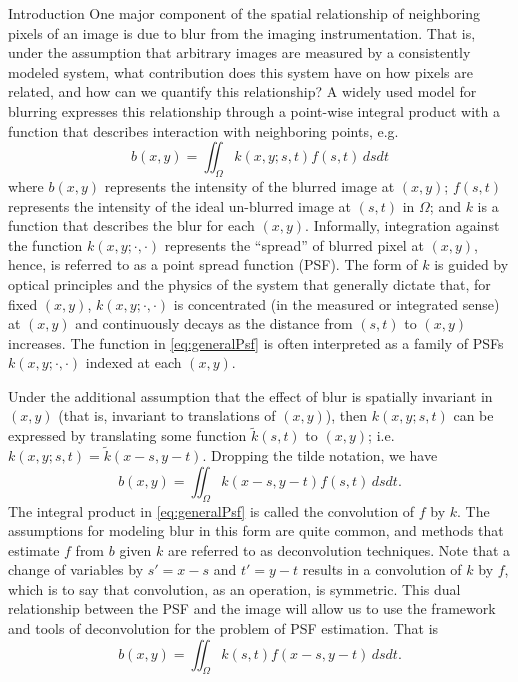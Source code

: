 \begin{chapter}{Introduction}
  One major component of the spatial relationship of neighboring pixels of an image is due to blur from the imaging instrumentation.
  That is, under the assumption that arbitrary images are measured by a consistently modeled system, what contribution does this system have on how pixels are related, and how can we quantify this relationship?
  A widely used model for blurring \citep{hansen2010,jain1989,vogel2002,epstein2008} expresses this relationship through a point-wise integral product with a function that describes interaction with neighboring points, e.g.
  \begin{equation}\label{eq:generalPsf}
    b(x,y) = \iint_{\Omega} k(x,y;s,t) f(s,t)\,dsdt
  \end{equation}
  where $b(x,y)$ represents the intensity of the blurred image at $(x,y)$; $f(s,t)$ represents the intensity of the ideal un-blurred image at $(s,t)$ in $\Omega$; and $k$ is a function that describes the blur for each $(x,y)$.
  Informally, integration against the function $k(x,y;\cdot,\cdot)$ represents the ``spread'' of blurred pixel at $(x,y)$, hence, is referred to as a point spread function (PSF).
  The form of $k$ is guided by optical principles and the physics of the system that generally dictate that, for fixed $(x,y)$, $k(x,y;\cdot,\cdot)$ is concentrated (in the measured or integrated sense) at $(x,y)$ and continuously decays as the distance from $(s,t)$ to $(x,y)$ increases.
  The function in \eqref{eq:generalPsf} is often interpreted as a family of PSFs $k(x,y;\cdot,\cdot)$ indexed at each $(x,y)$.

  Under the additional assumption that the effect of blur is spatially invariant in $(x,y)$ (that is, invariant to translations of $(x,y)$), then $k(x,y;s,t)$ can be expressed by translating some function $\tilde k(s,t)$ to $(x,y)$; i.e.~ $k(x,y;s,t) = \tilde k(x-s,y-t)$.  
  Dropping the tilde notation, we have
\begin{equation}\label{eq:convolutionDeterministic}
  b(x,y) = \iint_{\Omega} k(x-s,y-t) f(s,t)\,dsdt.
\end{equation}
  The integral product in \eqref{eq:generalPsf} is called the convolution of $f$ by $k$.
  The assumptions for modeling blur in this form are quite common, and methods that estimate $f$ from $b$ given $k$ are referred to as deconvolution techniques.
  Note that a change of variables by $s'=x-s$ and $t'=y-t$ results in a convolution of $k$ by $f$, which is to say that convolution, as an operation, is symmetric.
  This dual relationship between the PSF and the image will allow us to use the framework and tools of deconvolution for the problem of PSF estimation.
  That is
  \begin{equation}\label{eq:dualConvolutionDeterministic}
    b(x,y) = \iint_{\Omega} k(s,t) f(x-s,y-t)\,dsdt.
  \end{equation}


\end{chapter}
